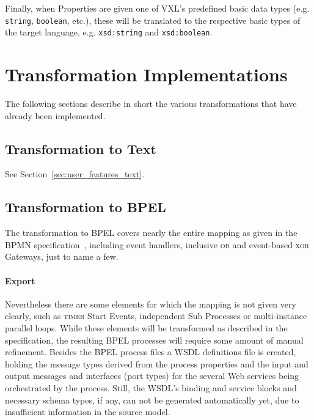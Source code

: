 Finally, when Properties are given one of VXL's predefined basic data types (e.g.
\texttt{string}, \texttt{boolean}, etc.), these will be translated to the
respective basic types of the target language, e.g. \texttt{xsd:string} and
\texttt{xsd:boolean}.



\section{Transformation Implementations}

The following sections describe in short the various transformations that have
already been implemented.


\subsection{Transformation to Text}

See Section~\ref{sec:user_features_text}.


\subsection{Transformation to BPEL}
\label{sec:user_trafo_bpel}

The transformation to BPEL covers nearly the entire mapping as given in the BPMN
specification~\cite[Appendix A]{omg2009bpmn}, including event handlers, inclusive
\textsc{or} and event-based \textsc{xor} Gateways, just to name a few.

\paragraph{Export}
Nevertheless there are some elements for which the mapping is not given very
clearly, such as \textsc{timer} Start Events, independent Sub Processes or
multi-instance parallel loops.  While these elements will be transformed as
described in the specification, the resulting BPEL processes will require some
amount of manual refinement.  Besides the BPEL process files a WSDL definitions
file is created, holding the message types derived from the process properties
and the input and output messages and interfaces (port types) for the several Web
services being orchestrated by the process.  Still, the WSDL's binding and service
blocks and necessary schema types, if any, can not be generated automatically
yet, due to insufficient information in the source model.

